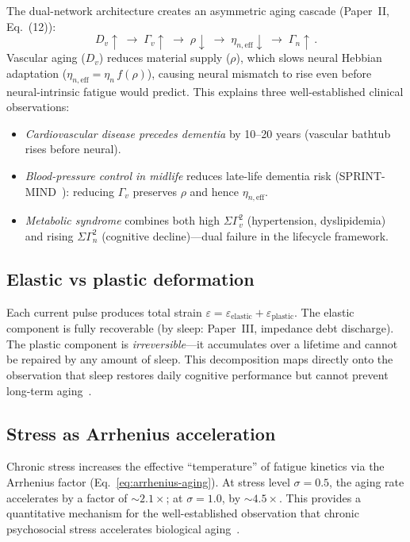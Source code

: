 ﻿\documentclass[aps,pre,twocolumn,superscriptaddress,floatfix]{revtex4-2}
\begin{document}
The dual-network architecture creates an asymmetric aging
cascade (Paper~II, Eq.~(12)):
\begin{equation}
  D_v\!\uparrow \;\to\;
    \Gamma_v\!\uparrow \;\to\;
    \rho\!\downarrow \;\to\;
    \eta_{n,\mathrm{eff}}\!\downarrow \;\to\;
    \Gamma_n\!\uparrow\,.
  \label{eq:aging-cascade}
\end{equation}
Vascular aging ($D_v$) reduces material supply ($\rho$),
which slows neural Hebbian adaptation ($\eta_{n,\mathrm{eff}}
= \eta_n\,f(\rho)$), causing neural mismatch to rise
even before neural-intrinsic fatigue would predict.
This explains three well-established clinical observations:
\begin{itemize}
  \item \emph{Cardiovascular disease precedes dementia} by
    10--20 years (vascular bathtub rises before neural).
  \item \emph{Blood-pressure control in midlife} reduces late-life
    dementia risk (SPRINT-MIND~\cite{sprint2019}): reducing
    $\Gamma_v$ preserves $\rho$ and hence $\eta_{n,\mathrm{eff}}$.
  \item \emph{Metabolic syndrome} combines both high $\Sigma\Gamma_v^2$
    (hypertension, dyslipidemia) and rising $\Sigma\Gamma_n^2$
    (cognitive decline)---dual failure in the lifecycle framework.
\end{itemize}

\subsection{Elastic vs plastic deformation}

Each current pulse produces total strain
$\varepsilon = \varepsilon_{\mathrm{elastic}}
+ \varepsilon_{\mathrm{plastic}}$.
The elastic component is fully recoverable
(by sleep: Paper~III, impedance debt discharge).
The plastic component is \emph{irreversible}---it
accumulates over a lifetime and cannot be repaired
by any amount of sleep.
This decomposition maps directly onto the
observation that sleep restores daily cognitive
performance but cannot prevent long-term
aging~\cite{Walker2017}.

\subsection{Stress as Arrhenius acceleration}

Chronic stress increases the effective ``temperature''
of fatigue kinetics via the Arrhenius factor
(Eq.~\eqref{eq:arrhenius-aging}).
At stress level $\sigma = 0.5$, the aging rate
accelerates by a factor of $\sim 2.1\times$;
at $\sigma = 1.0$, by $\sim 4.5\times$.
This provides a quantitative mechanism for the
well-established observation that chronic
psychosocial stress accelerates biological
aging~\cite{Epel2004}.
\end{document}
